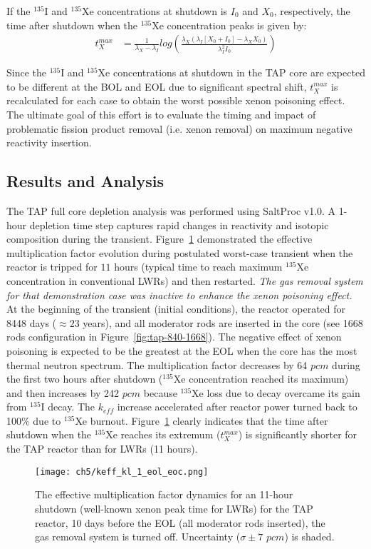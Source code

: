 If the $^{135}$I and $^{135}$Xe concentrations at shutdown is $I_0$ and $X_0$, 
respectively, the time after shutdown when the $^{135}$Xe concentration peaks 
is given by:
\begin{align}\label{eq:time-xe-max}
t^{max}_X &= \frac{1}{\lambda_X-\lambda_I}
log\left(\frac{\lambda_X(\lambda_I[X_0+I_0]-\lambda_XX_0)}{\lambda_I^2 
I_0}\right)
\end{align}

Since the $^{135}$I and $^{135}$Xe concentrations at shutdown in the \gls{TAP} 
core are expected to be different at the \gls{BOL} and \gls{EOL} due to 
significant spectral shift, $t^{max}_X$ is recalculated for each case to 
obtain the worst possible xenon poisoning effect. The ultimate goal of this 
effort is to evaluate the timing and impact of problematic fission product 
removal (i.e. xenon removal) on maximum negative reactivity insertion.



\subsection{Results and Analysis}
The \gls{TAP} full core depletion analysis was performed using SaltProc v1.0. 
A 1-hour depletion time step captures rapid changes in reactivity and 
isotopic composition during the transient. 
Figure~\ref{fig:lf-tap-keff-eol-eoc-no} demonstrated the effective 
multiplication factor evolution during postulated worst-case transient when 
the reactor is tripped for $11$ hours (typical time to reach maximum 
$^{135}$Xe concentration in conventional \glspl{LWR}) and then restarted. 
\emph{The gas removal system for that demonstration case was inactive to 
enhance the xenon poisoning effect.} At the beginning of the transient 
(initial conditions), the reactor operated for 8448 days ($\approx23$ years), 
and all moderator rods are inserted in the core (see 1668 rods configuration 
in Figure~\ref{fig:tap-840-1668}). The negative effect of xenon poisoning is 
expected to be the greatest at the \gls{EOL} when the core has the most 
thermal neutron spectrum. 
The multiplication factor decreases by 64 $pcm$ during the first two hours 
after shutdown ($^{135}$Xe concentration reached its maximum) and then 
increases by 242 $pcm$ because $^{135}$Xe loss due to decay overcame its gain 
from $^{135}$I decay. The $k_{eff}$ increase accelerated after reactor power 
turned back to 100\% due to $^{135}$Xe burnout. 
Figure~\ref{fig:lf-tap-keff-eol-eoc-no} clearly indicates that the time after 
shutdown when the $^{135}$Xe reaches its extremum ($t^{max}_X$) is 
significantly shorter for the \gls{TAP} reactor than for \glspl{LWR} (11 
hours).
\begin{figure}[htp!] %
	\centering
	\texttt{[image: ch5/keff\_kl\_1\_eol\_eoc.png]}
	\caption{The effective multiplication factor dynamics for an 11-hour 
		shutdown (well-known xenon peak time for \glspl{LWR}) for the TAP 
		reactor, 
		10 days before the \gls{EOL} (all moderator rods inserted), the gas 
		removal system is turned off. Uncertainty ($\sigma\pm7$ $pcm$) is 
		shaded.}
	\label{fig:lf-tap-keff-eol-eoc-no}
\end{figure}

